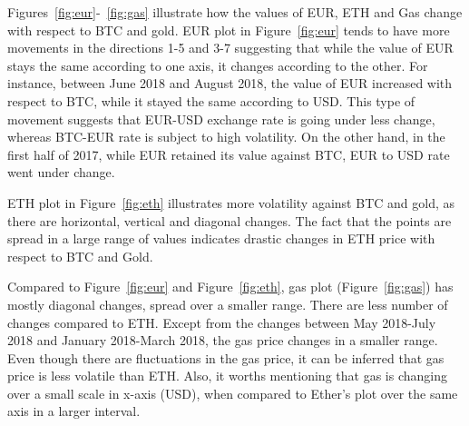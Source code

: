 




Figures~\ref{fig:eur}-~\ref{fig:gas} illustrate how the values of EUR, ETH and Gas change with respect to BTC and gold. EUR plot in Figure~\ref{fig:eur} tends to have more movements in the directions 1-5 and 3-7 suggesting that while the value of EUR stays the same according to one axis, it changes according to the other. For instance, between June 2018 and August 2018, the value of EUR increased with respect to BTC, while it stayed the same according to USD. This type of movement suggests that EUR-USD exchange rate is going under less change, whereas BTC-EUR rate is subject to high volatility. On the other hand, in the first half of 2017, while EUR retained its value against BTC, EUR to USD rate went under change.

ETH plot in Figure~\ref{fig:eth} illustrates more volatility against BTC and gold, as there are horizontal, vertical and diagonal changes. The fact that the points are spread in a large range of values indicates drastic changes in ETH price with respect to BTC and Gold.

Compared to Figure~\ref{fig:eur} and Figure~\ref{fig:eth}, gas plot (Figure~\ref{fig:gas}) has mostly diagonal changes, spread over a smaller range. There are less number of changes compared to ETH. Except from the changes between May 2018-July 2018 and January 2018-March 2018, the gas price changes in a smaller range. Even though there are fluctuations in the gas price, it can be inferred that gas price is less volatile than ETH. Also, it worths mentioning that gas is changing over a small scale in x-axis (USD), when compared to Ether's plot over the same axis in a larger interval.


